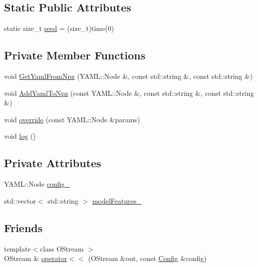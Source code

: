 \subsection*{Static Public Attributes}
\begin{DoxyCompactItemize}
\item 
static size\+\_\+t \hyperlink{classmarian_1_1Config_a5261277034b2e2268225bfbc32682cb4}{seed} = (size\+\_\+t)time(0)
\end{DoxyCompactItemize}
\subsection*{Private Member Functions}
\begin{DoxyCompactItemize}
\item 
void \hyperlink{classmarian_1_1Config_a2e2137806bbb54f3e8aab100680d62f0}{Get\+Yaml\+From\+Npz} (Y\+A\+M\+L\+::\+Node \&, const std\+::string \&, const std\+::string \&)
\item 
void \hyperlink{classmarian_1_1Config_a1dd63c638735224839b6faa7050c7f7a}{Add\+Yaml\+To\+Npz} (const Y\+A\+M\+L\+::\+Node \&, const std\+::string \&, const std\+::string \&)
\item 
void \hyperlink{classmarian_1_1Config_a187242dd22d9d6d18aca5417f5cc7f51}{override} (const Y\+A\+M\+L\+::\+Node \&params)
\item 
void \hyperlink{classmarian_1_1Config_a04803eb8aac3297bc9da7d697cd07ba0}{log} ()
\end{DoxyCompactItemize}
\subsection*{Private Attributes}
\begin{DoxyCompactItemize}
\item 
Y\+A\+M\+L\+::\+Node \hyperlink{classmarian_1_1Config_acbe4dfabd18c2c561be60fa5adc28c3b}{config\+\_\+}
\item 
std\+::vector$<$ std\+::string $>$ \hyperlink{classmarian_1_1Config_a63b2b2a9be247234930b5e2e55d97e11}{model\+Features\+\_\+}
\end{DoxyCompactItemize}
\subsection*{Friends}
\begin{DoxyCompactItemize}
\item 
{\footnotesize template$<$class O\+Stream $>$ }\\O\+Stream \& \hyperlink{classmarian_1_1Config_a12edc9cd675b196fa52930d9058c1ad2}{operator$<$$<$} (O\+Stream \&out, const \hyperlink{classmarian_1_1Config}{Config} \&config)
\end{DoxyCompactItemize}


